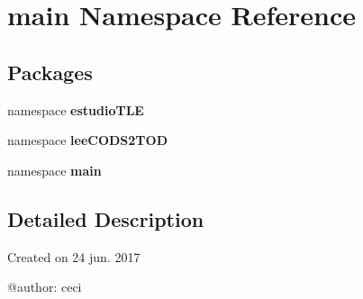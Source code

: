 \section{main \-Namespace \-Reference}
\label{namespacemain}
\subsection*{\-Packages}
\begin{DoxyCompactItemize}
\item 
namespace {\bf estudio\-T\-L\-E}
\item 
namespace {\bf lee\-C\-O\-D\-S2\-T\-O\-D}
\item 
namespace {\bf main}
\end{DoxyCompactItemize}


\subsection{\-Detailed \-Description}
\begin{DoxyVerb}
Created on 24 jun. 2017

@author: ceci
\end{DoxyVerb}
 